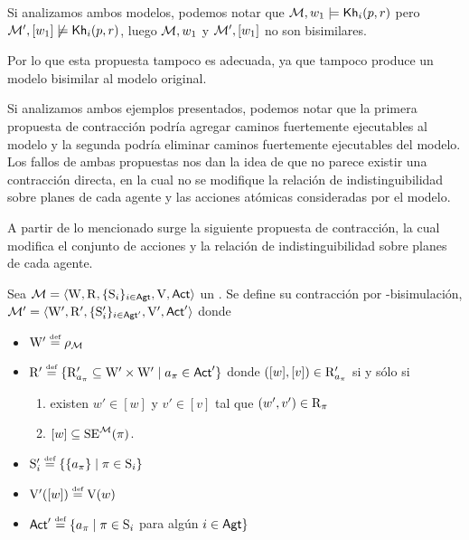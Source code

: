 Si analizamos ambos modelos, podemos notar que $\mathcal{M},w_1 \models \mathsf{Kh}_i(p,r)$ pero $\mathcal{M}',[w_1] \not\models \mathsf{Kh}_i(p,r)$, luego 
$\mathcal{M},w_1$ y $\mathcal{M}',[w_1]$ no son bisimilares.

Por lo que esta propuesta tampoco es adecuada, ya que tampoco produce un modelo bisimilar al modelo original.

Si analizamos ambos ejemplos presentados, podemos notar que la primera propuesta de contracción podría agregar caminos fuertemente ejecutables al modelo 
y la segunda podría eliminar caminos fuertemente ejecutables del modelo. Los fallos de ambas propuestas nos dan la idea de que no parece 
existir una contracción directa, en la cual no se modifique la relación de indistinguibilidad sobre planes de cada agente y las acciones 
atómicas consideradas por el modelo. 

A partir de lo mencionado surge la siguiente propuesta de contracción, la cual modifica el conjunto de acciones y la relación de indistinguibilidad 
sobre planes de cada agente.


\begin{definicion}\label{def:1st-contraction}
    Sea $\mathcal{M}=\langle \mathrm{W},\mathrm{R},\{ \mathrm{S}_i \}_{i \in {\rm \sf Agt}},\mathrm{V},{\rm \sf Act} \rangle$ un \ults. Se define su contracción por \KHilogic-bisimulación, 
    $\mathcal{M}'=\langle \mathrm{W}',\mathrm{R}',\{ \mathrm{S}_i' \}_{i \in {\rm \sf Agt}'},\mathrm{V}',{\rm \sf Act}' \rangle$ donde 
    \begin{center}
        \begin{itemize}
            \item $\W' \eqdef \rho_\model$
            \item $\R' \eqdef \{\R'_{a_\pi} \subseteq \W' \times \W' \mid a_\pi \in \ACT'\}$ donde $([w],[v]) \in \mathrm{R}'_{a_\pi}$ si y sólo si
            \begin{enumerate}
                \item existen $w' \in [w]$ y $v' \in [v]$ tal que $(w',v')\in \mathrm{R}_\pi$
                \item $[w] \subseteq \mathrm{SE}^{\mathcal{M}}(\pi)$.
            \end{enumerate}
            \item $\S_i' \eqdef \{ \{a_\pi\} \mid \pi \in \S_i \}$
            \item $\V'([w]) \eqdef \V(w)$
            \item $\ACT' \eqdef \{a_\pi \mid \pi\in \S_i$ para algún $i \in {\rm \sf Agt} \}$ 
        \end{itemize}
    \end{center}
\end{definicion}
    
